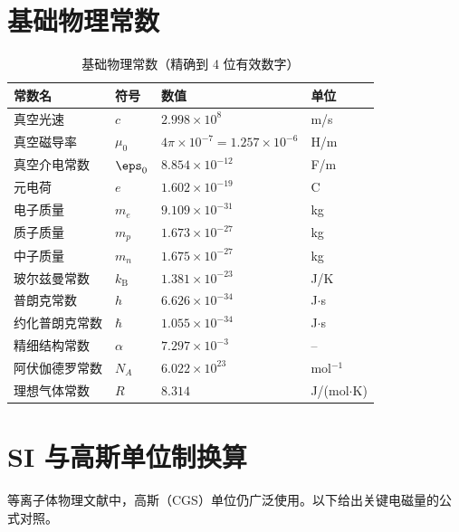 \section{基础物理常数}

\begin{table}[htbp]
\centering
\caption{基础物理常数（精确到 4 位有效数字）}
\label{tab:constants}
\begin{tabular}{@{}llll@{}}
\toprule
\textbf{常数名} & \textbf{符号} & \textbf{数值} & \textbf{单位} \\
\midrule
真空光速 & $c$ & $2.998\times 10^{8}$ & m/s \\
真空磁导率 & $\mu_0$ & $4\pi\times 10^{-7} = 1.257\times 10^{-6}$ & H/m \\
真空介电常数 & $\eps_0$ & $8.854\times 10^{-12}$ & F/m \\
元电荷 & $e$ & $1.602\times 10^{-19}$ & C \\
电子质量 & $m_e$ & $9.109\times 10^{-31}$ & kg \\
质子质量 & $m_p$ & $1.673\times 10^{-27}$ & kg \\
中子质量 & $m_n$ & $1.675\times 10^{-27}$ & kg \\
玻尔兹曼常数 & $k_\mathrm{B}$ & $1.381\times 10^{-23}$ & J/K \\
普朗克常数 & $h$ & $6.626\times 10^{-34}$ & J$\cdot$s \\
约化普朗克常数 & $\hbar$ & $1.055\times 10^{-34}$ & J$\cdot$s \\
精细结构常数 & $\alpha$ & $7.297\times 10^{-3}$ & -- \\
阿伏伽德罗常数 & $N_A$ & $6.022\times 10^{23}$ & mol$^{-1}$ \\
理想气体常数 & $R$ & $8.314$ & J/(mol$\cdot$K) \\
\bottomrule
\end{tabular}
\end{table}


\section{SI 与高斯单位制换算}

等离子体物理文献中，高斯（CGS）单位仍广泛使用。以下给出关键电磁量的公式对照。


